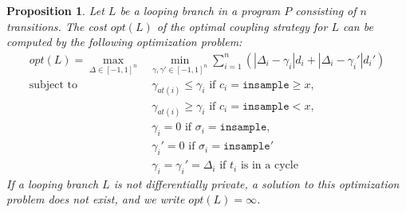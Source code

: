 \documentclass[12pt]{article}
\newcommand{\gguard}[1][x]{\texttt{insample}\geq#1}
\newcommand{\lguard}[1][x]{\texttt{insample} < #1}
\newtheorem{prop}[thm]{Proposition}
\theoremstyle{definition}
\begin{document}
\begin{prop}
    \label{prop:compute_opt_cost}
    Let $L$ be a looping branch in a program $P$ consisting of $n$ transitions. The cost $opt(L)$ of the optimal coupling strategy for $L$ can be computed by the following optimization problem: 
    \begin{align*}
        opt(L) = \max_{\Delta \in [-1, 1]^n} &\min_{\gamma, \gamma' \in [-1, 1]^n} \sum_{i = 1}^n \left(|\Delta_i - \gamma_i| d_i + |\Delta_i - \gamma_i'|d_i' \right)\\ 
            \text{subject to }
            &\ \gamma_{at(i)} \leq \gamma_i \text{ if } c_i = \gguard, \\
            &\ \gamma_{at(i)} \geq \gamma_i \text{ if } c_i = \lguard, \\
            &\ \gamma_i = 0 \text{ if } \sigma_i = \texttt{insample}, \\
            &\ \gamma_i' = 0 \text{ if } \sigma_i = \texttt{insample}'\\
            &\ \gamma_i = \gamma_i'= \Delta_i \text{ if } t_i \text{ is in a cycle}
    \end{align*}
    If a looping branch $L$ is not differentially private, a solution to this optimization problem does not exist, and we write $opt(L) = \infty$.
\end{prop}
\end{document}
